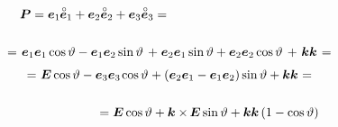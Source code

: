 \begin{figure}[!htbp]
\vspace{-1em}
\begin{multline*}
\shoveleft{ \bm{P} = \bm{e}_1 \hspace{-0.1ex} \mathcircabove{\bm{e}}_1 + \bm{e}_2 \mathcircabove{\bm{e}}_2 + \bm{e}_3 \mathcircabove{\bm{e}}_3 = \hfill }\\[1.5em]
%
= \hspace{0.2ex} \tikzmark{StartBraceE1E1} {\bm{e}_1 \bm{e}_1 \operatorname{cos} \vartheta - \bm{e}_1 \bm{e}_2 \operatorname{sin} \vartheta \hspace{0.2em}} \tikzmark{EndBraceE1E1} \hspace{-0.1ex} + \hspace{0.1ex} \tikzmark{StartBraceE2E2} {\bm{e}_2 \bm{e}_1 \operatorname{sin} \vartheta + \bm{e}_2 \bm{e}_2 \operatorname{cos} \vartheta \hspace{0.2em}} \tikzmark{EndBraceE2E2} \hspace{-0.1ex} + \tikzmark{StartBraceE3E3} {\hspace{0.25ex} \bm{k} \bm{k} \hspace{0.1ex}} \tikzmark{EndBraceE3E3} \hspace{0.1ex} =\\[0.32em]
%
= \hspace{0.1ex} \bm{E} \operatorname{cos} \vartheta - \hspace{-0.1ex} \tikzmark{StartBraceKk} {\hspace{0.1ex}\bm{e}_3 \bm{e}_3\hspace{0.1ex}} \tikzmark{EndBraceKk} \hspace{-0.25ex} \operatorname{cos} \vartheta \hspace{0.1ex} + \tikzmark{StartBraceLeviCivita} {\left( \bm{e}_2 \bm{e}_1 - \bm{e}_1 \bm{e}_2 \right)} \tikzmark{EndBraceLeviCivita} \operatorname{sin} \vartheta + \bm{k} \bm{k} \hspace{0.1ex} =\\[1.5em]
%
\shoveright{ \hfill = \bm{E} \operatorname{cos} \vartheta + \bm{k} \times\hspace{-0.2ex} \bm{E} \operatorname{sin} \vartheta + \bm{k} \bm{k} \left({1 - \operatorname{cos} \vartheta}\right) }
\end{multline*}


\vspace{-0.5em}
\caption{}\label{fig:eulerfiniterotation}
\end{figure}
